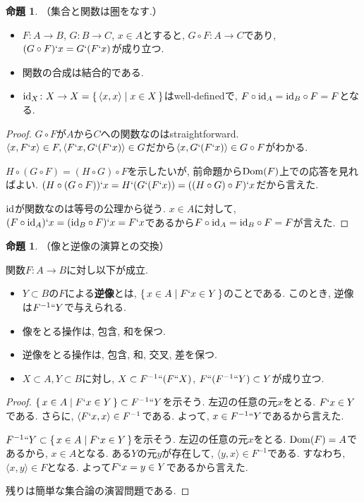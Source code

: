 \documentclass[a4paper, twoside]{bxjsarticle}
\theoremstyle{definition}
\newtheorem{prop}[thm]{命題}
\begin{document}
        \begin{prop}
            （集合と関数は圏をなす.）
            \begin{itemize}
                \item $F\colon A \to B$, $G\colon B\to C$, $x\in A$とすると, $G\circ F\colon A\to C$であり, $(G\circ F)`x = G`(F`x)$が成り立つ.  
                \item 関数の合成は結合的である.
                \item ${\rm id}_X\colon X\to X = \set{\langle x, x\rangle|x\in X}$はwell-definedで, $F\circ {\rm id}_A = {\rm id}_B \circ F = F$となる.
            \end{itemize}
        \end{prop}
        \begin{proof}
            $G\circ F$が$A$から$C$への関数なのはstraightforward. $\langle x, F`x\rangle \in F, \langle F`x, G`(F`x)\rangle \in G$だから$\langle x, G`(F`x)\rangle \in G\circ F$がわかる.
            
            $H\circ(G\circ F) = (H\circ G)\circ F$を示したいが, 前命題から${\rm Dom}(F)$上での応答を見ればよい. $(H\circ(G\circ F))`x = H`(G`(F`x))=((H\circ G)\circ F)`x$だから言えた.
            
            ${\rm id}$が関数なのは等号の公理から従う. $x\in A$に対して, $(F\circ {\rm id}_A)`x = ({\rm id}_B \circ F)`x = F`x$であるから$F\circ {\rm id}_A = {\rm id}_B \circ F = F$が言えた.
        \end{proof}
        \begin{prop}
            （像と逆像の演算との交換）
            
            関数$F\colon A\to B$に対し以下が成立.
            \begin{itemize}
                \item $Y\subset B$の$F$による\textbf{逆像}とは, $\set{x\in A|F`x \in Y}$のことである. このとき, 逆像は$F^{-1}``Y$で与えられる.
                \item 像をとる操作は, 包含, 和を保つ.
                \item 逆像をとる操作は, 包含, 和, 交叉, 差を保つ.
                \item $X\subset A, Y\subset B$に対し, $X \subset F^{-1}``(F``X)$, $F``(F^{-1}``Y) \subset Y$が成り立つ.
            \end{itemize}
        \end{prop}
        \begin{proof}
            $\set{x\in A|F`x \in Y}\subset F^{-1}``Y$を示そう. 左辺の任意の元$x$をとる. $F`x \in Y$である. さらに, $\langle F`x, x\rangle \in F^{-1}$である. よって, $x\in F^{-1}``Y$であるから言えた.
            
            $F^{-1}``Y \subset \set{x\in A|F`x \in Y}$を示そう. 左辺の任意の元$x$をとる. ${\rm Dom}(F)=A$であるから, $x\in A$となる. ある$Y$の元$y$が存在して, $\langle y, x\rangle \in F^{-1}$である. すなわち, $\langle x, y\rangle \in F$となる. よって$F`x = y\in Y$であるから言えた.
            
            残りは簡単な集合論の演習問題である.
        \end{proof}
\end{document}

